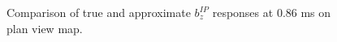 \documentclass[extra,mreferee]{gji}
\begin{document}
\begin{figure}
  \caption{Comparison of true and approximate $b_z^{IP}$ responses at 0.86 ms on plan view map. }
  \label{F:EquivPeta_True_Approx}
\end{figure}
\clearpage
\end{document}
